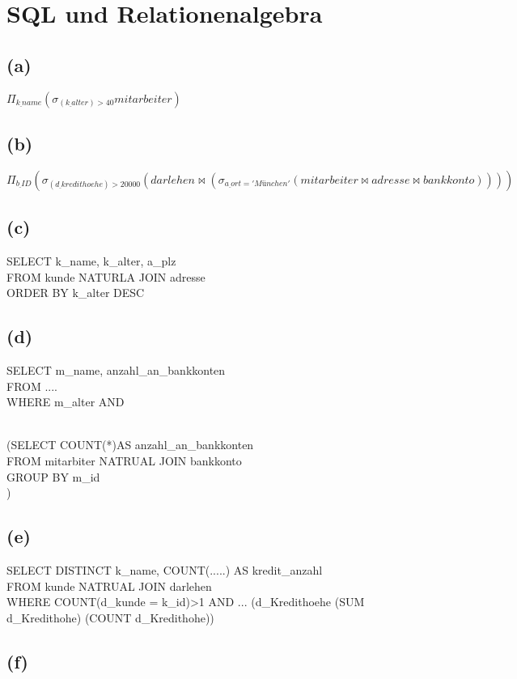\documentclass{article}
\begin{document}
\section{SQL und Relationenalgebra}
\subsection{(a)}
$\Pi_{k \underline{ }name}(\sigma_{(k \underline{ }alter)> 40} mitarbeiter)$

\subsection{(b)}
$\Pi_{b\underline{ }ID}(\sigma_{(d\underline{ }kredithoehe)>20000} (darlehen \bowtie (\sigma_{a\underline{ }ort='München'}(mitarbeiter \bowtie adresse \bowtie bankkonto)))) $


\subsection{(c)}
SELECT k_name, k_alter, a_plz \\
FROM kunde NATURLA JOIN adresse \\
ORDER BY k_alter DESC \\

\subsection{(d)}
SELECT m_name, anzahl_an_bankkonten \\
FROM .... \\
WHERE m_alter AND   \\\

(SELECT COUNT(*)AS anzahl_an_bankkonten\\
FROM mitarbiter NATRUAL JOIN bankkonto\\
GROUP BY m_id\\)

 \subsection{(e)}
 SELECT DISTINCT k_name, COUNT(.....) AS kredit_anzahl\\
 FROM kunde NATRUAL JOIN darlehen\\
 WHERE COUNT(d_kunde = k_id)>1 AND ...
 (d_Kredithoehe \geq (SUM d_Kredithohe) \div (COUNT d_Kredithohe))

 \subsection{(f)}
\end{document}
